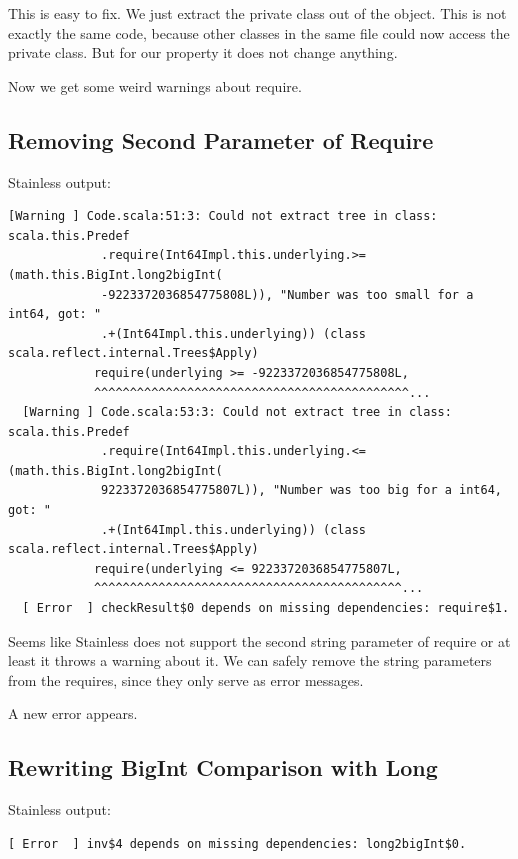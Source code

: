 \documentclass[runningheads]{llncs}
\begin{document}
This is easy to fix.
We just extract the private class out of the object.
This is not exactly the same code, because other classes in the same file could now access the private class.
But for our property it does not change anything.

Now we get some weird warnings about require.


\subsection{Removing Second Parameter of Require}

Stainless output:
\begin{lstlisting}[style=stainless]
  [Warning ] Code.scala:51:3: Could not extract tree in class: scala.this.Predef
             .require(Int64Impl.this.underlying.>=(math.this.BigInt.long2bigInt(
             -9223372036854775808L)), "Number was too small for a int64, got: "
             .+(Int64Impl.this.underlying)) (class scala.reflect.internal.Trees$Apply)
            require(underlying >= -9223372036854775808L,
            ^^^^^^^^^^^^^^^^^^^^^^^^^^^^^^^^^^^^^^^^^^^^...
  [Warning ] Code.scala:53:3: Could not extract tree in class: scala.this.Predef
             .require(Int64Impl.this.underlying.<=(math.this.BigInt.long2bigInt(
             9223372036854775807L)), "Number was too big for a int64, got: "
             .+(Int64Impl.this.underlying)) (class scala.reflect.internal.Trees$Apply)
            require(underlying <= 9223372036854775807L,
            ^^^^^^^^^^^^^^^^^^^^^^^^^^^^^^^^^^^^^^^^^^^...
  [ Error  ] checkResult$0 depends on missing dependencies: require$1.
\end{lstlisting}

Seems like Stainless does not support the second string parameter of require or at least it throws a warning about it.
We can safely remove the string parameters from the requires, since they only serve as error messages.

A new error appears.


\subsection{Rewriting BigInt Comparison with Long}

Stainless output:
\begin{lstlisting}[style=stainless]
  [ Error  ] inv$4 depends on missing dependencies: long2bigInt$0.
\end{lstlisting}
\end{document}
